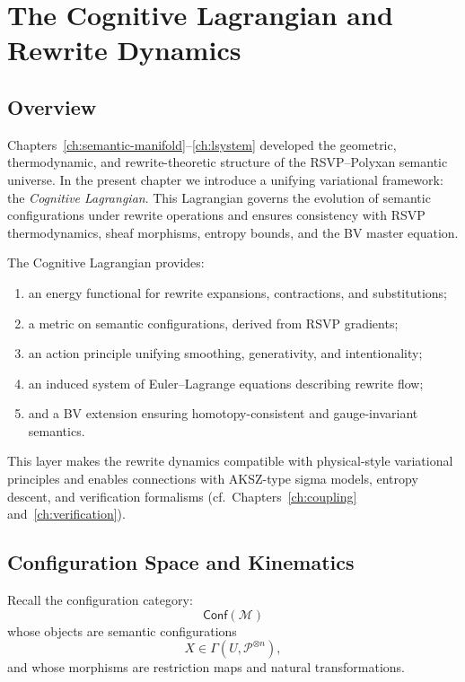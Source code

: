 \chapter{The Cognitive Lagrangian and Rewrite Dynamics}
\label{ch:cognitive-lagrangian}

\section{Overview}

Chapters~\ref{ch:semantic-manifold}--\ref{ch:lsystem} developed the geometric,
thermodynamic, and rewrite-theoretic structure of the RSVP--Polyxan semantic
universe. In the present chapter we introduce a unifying variational framework:
the \emph{Cognitive Lagrangian}. This Lagrangian governs the evolution of
semantic configurations under rewrite operations and ensures consistency with
RSVP thermodynamics, sheaf morphisms, entropy bounds, and the BV master
equation.

The Cognitive Lagrangian provides:
\begin{enumerate}
  \item an energy functional for rewrite expansions, contractions, and
        substitutions;
  \item a metric on semantic configurations, derived from RSVP gradients;
  \item an action principle unifying smoothing, generativity, and intentionality;
  \item an induced system of Euler--Lagrange equations describing rewrite flow;
  \item and a BV extension ensuring homotopy-consistent and gauge-invariant
        semantics.
\end{enumerate}

This layer makes the rewrite dynamics compatible with physical-style
variational principles and enables connections with AKSZ-type sigma models,
entropy descent, and verification formalisms (cf.\
Chapters~\ref{ch:coupling} and~\ref{ch:verification}).

\section{Configuration Space and Kinematics}

Recall the configuration category:
\[
\mathsf{Conf}(\mathcal{M})
\]
whose objects are semantic configurations
\[
X \in \Gamma(U, \mathscr{P}^{\otimes n}),
\]
and whose morphisms are restriction maps and natural transformations.

